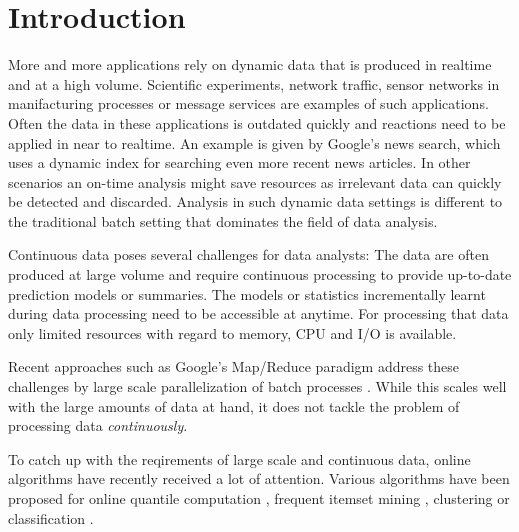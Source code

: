 \section{Introduction}
More and more applications rely on dynamic data that is produced in
realtime and at a high volume. Scientific experiments, network
traffic, sensor networks in manifacturing processes or message
services are examples of such applications. Often the data in these
applications is outdated quickly and reactions need to be applied in
near to realtime. An example is given by Google's news search, which
uses a dynamic index for searching even more recent news articles. In
other scenarios an on-time analysis might save resources as irrelevant
data can quickly be detected and discarded. Analysis in such dynamic
data settings is different to the traditional batch setting that
dominates the field of data analysis.  

Continuous data poses several challenges for data analysts: The data
are often produced at large volume and require continuous processing
to provide up-to-date prediction models or summaries. The models or
statistics incrementally learnt during data processing need to be
accessible at anytime. For processing that data only limited resources
with regard to memory, CPU and I/O is available. 

Recent approaches such as Google's Map/Reduce paradigm address these
challenges by large scale parallelization of batch processes
\cite{googleMapReduce,radoop}. While this scales well with the large
amounts of data at hand, it does not tackle the problem of processing
data {\em continuously}.


To catch up with the reqirements of large scale and continuous data,
online algorithms have recently received a lot of attention. Various
algorithms have been proposed for online quantile computation
\cite{Greenwald/Khanna/2001a,Arasu/Manku/2004a}, frequent itemset
mining
\cite{Charikar02findingfrequent,goethals2007,Cheng06maintainingfrequent},
clustering \cite{sohler2010,Aggarwal:2003} or classification
\cite{Domingos/Hulten/2000a}.


